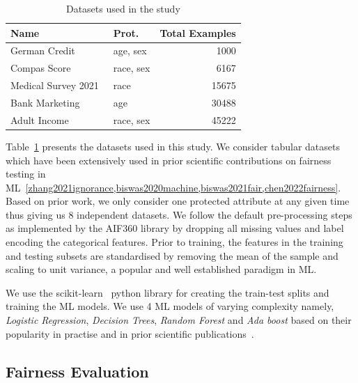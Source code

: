 \documentclass{article}
\begin{document}
\begin{table}
  \centering
  \begin{tabular}{l l r}
    \toprule
    \textbf{Name} & \textbf{Prot.} & \textbf{Total Examples}\\
    \midrule
    German Credit \cite{hofmann1994german} & age, sex & 1000\\
    Compas Score \cite{angwin2016machine} & race, sex & 6167\\
    Medical Survey 2021 \cite{mepsdata} & race & 15675\\
    Bank Marketing \cite{moro2014data} & age & 30488\\
    Adult Income \cite{kohavi1996scaling} & race, sex & 45222\\
    \bottomrule
  \end{tabular}
  \label{tab:datasets}
  \caption{Datasets used in the study}
\end{table}

Table \ref{tab:datasets} presents the datasets used in this study. We
consider tabular datasets which have been extensively used in prior
scientific contributions on fairness testing in
ML \ref{zhang2021ignorance,biswas2020machine,biswas2021fair,chen2022fairness}.
Based on prior work, we only consider one protected attribute at any
given time thus giving us 8 independent datasets. We follow the
default pre-processing steps as implemented by the AIF360 library by
dropping all missing values and label encoding the categorical
features. Prior to training, the features in the training and testing
subsets are standardised by removing the mean of the sample and
scaling to unit variance, a popular and well established paradigm in
ML.

We use the scikit-learn \cite{pedregosa2011scikit} python library for
creating the train-test splits and training the ML models. We use 4 ML
models of varying complexity namely, \emph{Logistic Regression},
\emph{Decision Trees}, \emph{Random Forest} and \emph{Ada boost} based
on their popularity in practise and in prior scientific
publications \cite{zhang2021ignorance,biswas2021fair,biswas2020machine}.

\subsection{Fairness Evaluation}\label{sec:method-fair-eval}
\end{document}
